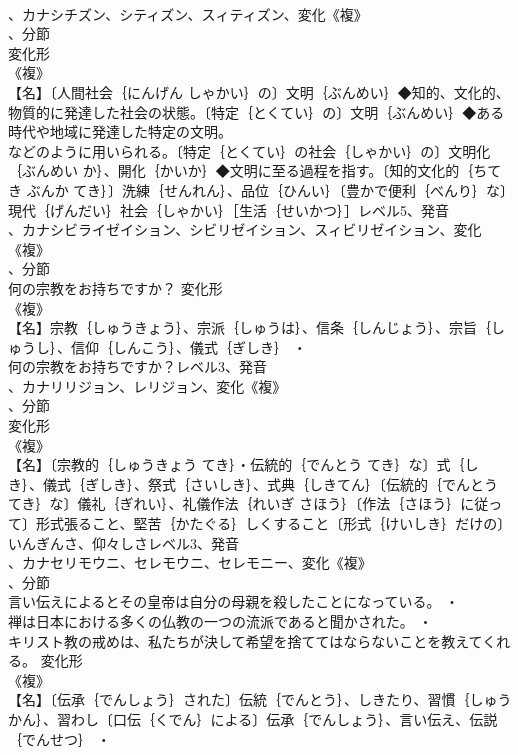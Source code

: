 \documentclass[8pt]{extreport}
\begin{document}
\begin{CJK}{UTF8}{min}
\\	、カナシチズン、シティズン、スィティズン、変化《複》
\\	、分節
\\	変化形 
\\	《複》
\\	【名】〔人間社会｛にんげん しゃかい｝の〕文明｛ぶんめい｝◆知的、文化的、物質的に発達した社会の状態。〔特定｛とくてい｝の〕文明｛ぶんめい｝◆ある時代や地域に発達した特定の文明。
\\	などのように用いられる。〔特定｛とくてい｝の社会｛しゃかい｝の〕文明化｛ぶんめい か｝、開化｛かいか｝◆文明に至る過程を指す。〔知的文化的｛ちてき ぶんか てき｝〕洗練｛せんれん｝、品位｛ひんい｝〔豊かで便利｛べんり｝な〕現代｛げんだい｝社会｛しゃかい｝［生活｛せいかつ｝］レベル5、発音
\\	、カナシビライゼイション、シビリゼイション、スィビリゼイション、変化《複》
\\	、分節
\\	何の宗教をお持ちですか？	変化形 
\\	《複》
\\	【名】宗教｛しゅうきょう｝、宗派｛しゅうは｝、信条｛しんじょう｝、宗旨｛しゅうし｝、信仰｛しんこう｝、儀式｛ぎしき｝ ・
\\	何の宗教をお持ちですか？レベル3、発音
\\	、カナリリジョン、レリジョン、変化《複》
\\	、分節
\\	変化形 
\\	《複》
\\	【名】〔宗教的｛しゅうきょう てき｝・伝統的｛でんとう てき｝な〕式｛しき｝、儀式｛ぎしき｝、祭式｛さいしき｝、式典｛しきてん｝〔伝統的｛でんとう てき｝な〕儀礼｛ぎれい｝、礼儀作法｛れいぎ さほう｝〔作法｛さほう｝に従って〕形式張ること、堅苦｛かたぐる｝しくすること〔形式｛けいしき｝だけの〕いんぎんさ、仰々しさレベル3、発音
\\	、カナセリモウニ、セレモウニ、セレモニー、変化《複》
\\	、分節
\\	言い伝えによるとその皇帝は自分の母親を殺したことになっている。 ・
\\	禅は日本における多くの仏教の一つの流派であると聞かされた。 ・
\\	キリスト教の戒めは、私たちが決して希望を捨ててはならないことを教えてくれる。	変化形 
\\	《複》
\\	【名】〔伝承｛でんしょう｝された〕伝統｛でんとう｝、しきたり、習慣｛しゅうかん｝、習わし〔口伝｛くでん｝による〕伝承｛でんしょう｝、言い伝え、伝説｛でんせつ｝ ・

\end{CJK}
\end{document}
